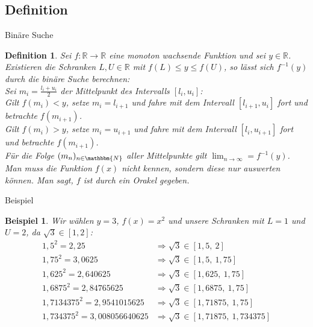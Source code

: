 \documentclass{beamer}
\newcommand{\N}{\mathbbm{N}} %
\newcommand{\R}{\mathbb{R}} %
\newtheorem{defi}[satz]{Definition}
\newtheorem{beispiel}[satz]{Beispiel}
\begin{document}
\subsection{Definition}
   \begin{frame}{Binäre Suche}
       \begin{defi}
            Sei $f: \R \to \R$ eine monoton wachsende Funktion und sei $y \in \R$. Existieren die Schranken $L,U \in \R$ mit $f(L) \leq y \leq f(U)$, so lässt sich $f^{-1}(y)$ durch die binäre Suche berechnen: \\
            Sei $m_i= \frac{l_i+u_i}{2}$ der Mittelpunkt des Intervalls $[l_i,u_i]$: \\
            Gilt $f(m_i)< y$, setze $m_i=l_{i+1}$ und fahre mit dem Intervall $[l_{i+1},u_i]$ fort und betrachte $f(m_{i+1})$. \\
            Gilt $f(m_i)>y$, setze $m_i=u_{i+1}$ und fahre mit dem Intervall $[l_i,u_{i+1}]$ fort und betrachte $f(m_{i+1})$. \\ 
            Für die Folge $(m_n)_{n \in \N}$ aller Mittelpunkte gilt $\lim_{n \to \infty} =f^{-1}(y)$.
            Man muss die Funktion $f(x)$ nicht kennen, sondern diese nur auswerten können. Man sagt, $f$ ist durch ein Orakel gegeben. 
       \end{defi}
   \end{frame}

   \begin{frame}{Beispiel}
       \begin{beispiel}
         Wir wählen $y=3$, $f(x)=x^2$ und unsere Schranken mit $L=1$ und $U=2$, da $\sqrt{3} \in [1,2]$: \\ 
        \begin{align*}
         1,5^2=2,25 &\Rightarrow \sqrt{3} \in [1,5,\: 2] \\
         1,75^2=3,0625 &\Rightarrow \sqrt{3} \in [1,5, \: 1,75] \\ 
         1,625^2=2,640625 &\Rightarrow \sqrt{3} \in [1,625, \: 1,75] \\
         1,6875^2=2,84765625 &\Rightarrow \sqrt{3} \in [1,6875, \: 1,75] \\
         1,7134375^2=2,9541015625 &\Rightarrow \sqrt{3} \in [1,71875, \: 1,75] \\
         1,734375^2=3,008056640625 &\Rightarrow \sqrt{3} \in [1,71875, \: 1,734375]
        \end{align*}
     \end{beispiel}
   \end{frame}
\end{document}
